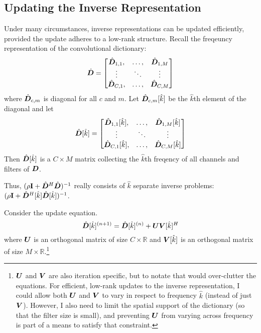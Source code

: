 \subsection{Updating the Inverse Representation}

Under many circumstances, inverse representations can be updated efficiently, provided the update adheres to a low-rank structure. Recall the freqeuncy representation of the convolutional dictionary:
%
\begin{equation}
\hat{\bm{D}} = \begin{bmatrix}
\hat{\bm{D}}_{1,1}, & \hdots, & \hat{\bm{D}}_{1,M}\\
\vdots & \ddots & \vdots\\
\hat{\bm{D}}_{C,1}, & \hdots, & \hat{\bm{D}}_{C,M}
\end{bmatrix}
\end{equation}
%
where $\hat{\bm{D}}_{c,m}$ is diagonal for all $c$ and $m$. Let $\hat{\bm{D}}_{c,m}[\hat{k}]$ be the $\hat{k}$th element of the diagonal and let
%
\begin{equation}
\hat{\bm{D}}[\hat{k}] = \begin{bmatrix}
\hat{\bm{D}}_{1,1}[\hat{k}], & \hdots, & \hat{\bm{D}}_{1,M}[\hat{k}]\\
\vdots & \ddots & \vdots\\
\hat{\bm{D}}_{C,1}[\hat{k}], & \hdots, & \hat{\bm{D}}_{C,M}[\hat{k}]
\end{bmatrix}
\end{equation}
%
Then $\hat{\bm{D}}[\hat{k}]$ is a $C \times M$ matrix collecting the $\hat{k}$th freqency of all channels and filters of $\bm{D}$.

Thus, $(\rho{\bf I} + \hat{\bm{D}}^H\hat{\bm{D}})^{-1}$ really consists of $\hat{k}$ separate inverse problems: $(\rho{\bf I} + \hat{\bm{D}}^H[\hat{k}]\hat{\bm{D}}[\hat{k}])^{-1}$.

Consider the update equation.
%
\begin{equation}
\hat{\bm{D}}[\hat{k}]^{(n + 1)} = \hat{\bm{D}}[\hat{k}]^{(n)} + \bm{U}\bm{V}[\hat{k}]^H
\end{equation}
%
where $\bm{U}$ is an orthogonal matrix of size $C \times \mathbb{R}$ and $\bm{V}[\hat{k}]$ is an orthogonal matrix of size $M \times \mathbb{R}$.\footnote{$\bm{U}$ and $\bm{V}$ are also iteration specific, but to notate that would over-clutter the equations. For efficient, low-rank updates to the inverse representation, I could allow both $\bm{U}$ and $\bm{V}$ to vary in respect to frequency $\hat{k}$ (instead of just $\bm{V}$). However, I also need to limit the spatial support of the dictionary (so that the filter size is small), and preventing $\bm{U}$ from varying across frequency is part of a means to satisfy that constraint.}

